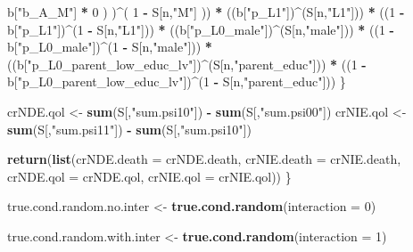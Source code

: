 \documentclass[
]{book}
\newenvironment{Shaded}{\begin{snugshade}}{\end{snugshade}}
\newcommand{\AttributeTok}[1]{\textcolor[rgb]{0.13,0.29,0.53}{#1}}
\newcommand{\DecValTok}[1]{\textcolor[rgb]{0.00,0.00,0.81}{#1}}
\newcommand{\FunctionTok}[1]{\textcolor[rgb]{0.13,0.29,0.53}{\textbf{#1}}}
\newcommand{\NormalTok}[1]{#1}
\newcommand{\OtherTok}[1]{\textcolor[rgb]{0.56,0.35,0.01}{#1}}
\newcommand{\SpecialCharTok}[1]{\textcolor[rgb]{0.81,0.36,0.00}{\textbf{#1}}}
\newcommand{\StringTok}[1]{\textcolor[rgb]{0.31,0.60,0.02}{#1}}
\begin{document}
\begin{Shaded}
\begin{Highlighting}[]
\NormalTok{                b[}\StringTok{"b\_A\_M"}\NormalTok{] }\SpecialCharTok{*} \DecValTok{0}\NormalTok{ ) )}\SpecialCharTok{\^{}}\NormalTok{( }\DecValTok{1} \SpecialCharTok{{-}}\NormalTok{ S[n,}\StringTok{"M"}\NormalTok{] )) }\SpecialCharTok{*}
\NormalTok{      ((b[}\StringTok{"p\_L1"}\NormalTok{])}\SpecialCharTok{\^{}}\NormalTok{(S[n,}\StringTok{"L1"}\NormalTok{])) }\SpecialCharTok{*}
\NormalTok{      ((}\DecValTok{1} \SpecialCharTok{{-}}\NormalTok{ b[}\StringTok{"p\_L1"}\NormalTok{])}\SpecialCharTok{\^{}}\NormalTok{(}\DecValTok{1} \SpecialCharTok{{-}}\NormalTok{ S[n,}\StringTok{"L1"}\NormalTok{])) }\SpecialCharTok{*}
\NormalTok{      ((b[}\StringTok{"p\_L0\_male"}\NormalTok{])}\SpecialCharTok{\^{}}\NormalTok{(S[n,}\StringTok{"male"}\NormalTok{])) }\SpecialCharTok{*} 
\NormalTok{      ((}\DecValTok{1} \SpecialCharTok{{-}}\NormalTok{ b[}\StringTok{"p\_L0\_male"}\NormalTok{])}\SpecialCharTok{\^{}}\NormalTok{(}\DecValTok{1} \SpecialCharTok{{-}}\NormalTok{ S[n,}\StringTok{"male"}\NormalTok{])) }\SpecialCharTok{*} 
\NormalTok{      ((b[}\StringTok{"p\_L0\_parent\_low\_educ\_lv"}\NormalTok{])}\SpecialCharTok{\^{}}\NormalTok{(S[n,}\StringTok{"parent\_educ"}\NormalTok{])) }\SpecialCharTok{*}
\NormalTok{      ((}\DecValTok{1} \SpecialCharTok{{-}}\NormalTok{ b[}\StringTok{"p\_L0\_parent\_low\_educ\_lv"}\NormalTok{])}\SpecialCharTok{\^{}}\NormalTok{(}\DecValTok{1} \SpecialCharTok{{-}}\NormalTok{ S[n,}\StringTok{"parent\_educ"}\NormalTok{])) }
\NormalTok{    \}}
  
\NormalTok{  crNDE.qol }\OtherTok{\textless{}{-}} \FunctionTok{sum}\NormalTok{(S[,}\StringTok{"sum.psi10"}\NormalTok{]) }\SpecialCharTok{{-}} \FunctionTok{sum}\NormalTok{(S[,}\StringTok{"sum.psi00"}\NormalTok{])}
\NormalTok{  crNIE.qol }\OtherTok{\textless{}{-}} \FunctionTok{sum}\NormalTok{(S[,}\StringTok{"sum.psi11"}\NormalTok{]) }\SpecialCharTok{{-}} \FunctionTok{sum}\NormalTok{(S[,}\StringTok{"sum.psi10"}\NormalTok{])}
  
  \FunctionTok{return}\NormalTok{(}\FunctionTok{list}\NormalTok{(}\AttributeTok{crNDE.death =}\NormalTok{ crNDE.death, }\AttributeTok{crNIE.death =}\NormalTok{ crNIE.death, }
              \AttributeTok{crNDE.qol =}\NormalTok{ crNDE.qol, }\AttributeTok{crNIE.qol =}\NormalTok{ crNIE.qol))}
\NormalTok{\}}
\end{Highlighting}
\end{Shaded}

\begin{Shaded}
\begin{Highlighting}[]
\NormalTok{true.cond.random.no.inter }\OtherTok{\textless{}{-}} \FunctionTok{true.cond.random}\NormalTok{(}\AttributeTok{interaction =} \DecValTok{0}\NormalTok{)}

\NormalTok{true.cond.random.with.inter }\OtherTok{\textless{}{-}} \FunctionTok{true.cond.random}\NormalTok{(}\AttributeTok{interaction =} \DecValTok{1}\NormalTok{)}
\end{Highlighting}
\end{Shaded}
\end{document}
